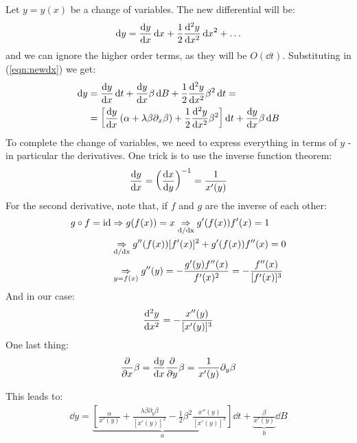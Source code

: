 \documentclass[../template.tex]{subfiles}
\begin{document}
\begin{exo}
Let $y=y(x)$ be a change of variables. The new differential will be:
\begin{align*}
    \dd{y} = \dv{y}{x} \dd{x} + \frac{1}{2} \dv[2]{y}{x} \dd{x}^2 + \dots
\end{align*}
and we can ignore the higher order terms, as they will be $O(\dd{t})$. Substituting in (\ref{eqn:newdx}) we get:
\begin{align*}
    \dd{y} &= \dv{y}{x} (\alpha + \lambda \beta \partial_x \beta) \dd{t} + \dv{y}{x} \beta \dd{B} + \frac{1}{2} \dv[2]{y}{x} \beta^2 \dd{t}  =\\
    &= \left[\dv{y}{x}\left(\alpha+ \lambda \beta \partial_x \beta \right) + \frac{1}{2} \dv[2]{y}{x} \beta^2 \right]\dd{t} + \dv{y}{x} \beta \dd{B}
\end{align*}
To complete the change of variables, we need to express everything in terms of $y$ - in particular the derivatives. One trick is to use the inverse function theorem:
\begin{align*}
    \dv{y}{x} = \left(\dv{x}{y}\right)^{-1} = \frac{1}{x'(y)} 
\end{align*}
For the second derivative, note that, if $f$ and $g$ are the inverse of each other:
\begin{align*}
    g \circ f = \operatorname{id} &\Rightarrow g(f(x)) = x \underset{\rm d/dx}{\Rightarrow} g'(f(x)) f'(x) = 1\\
     &\underset{\rm d/dx}{\Rightarrow} g''(f(x)) [f'(x)]^2 + g'(f(x)) f''(x) = 0 \\&\underset{y=f(x)}{\Rightarrow}  g''(y) = - \frac{g'(y) f''(x)}{f'(x)^2} = - \frac{f''(x)}{[f'(x)]^3}  
\end{align*}
And in our case:
\begin{align*}
    \dv[2]{y}{x} = -\frac{x''(y)}{[x'(y)]^3} 
\end{align*}
One last thing:
\begin{align*}
    \pdv{x} \beta = \dv{y}{x} \pdv{y} \beta = \frac{1}{x'(y)} \partial_y \beta 
\end{align*}

This leads to:
\begin{align*}
    \dd{y} = \underbrace{\left[\frac{\alpha}{x'(y)} + \frac{\lambda \beta \partial_y \beta}{[x'(y)]^2} - \frac{1}{2} \beta^2 \frac{x''(y)}{[x'(y)]^3}    \right]}_{a}  \dd{t} + \underbrace{\frac{\beta}{x'(y)}}_{b}  \dd{B} 
\end{align*}


\end{exo}
\end{document}
